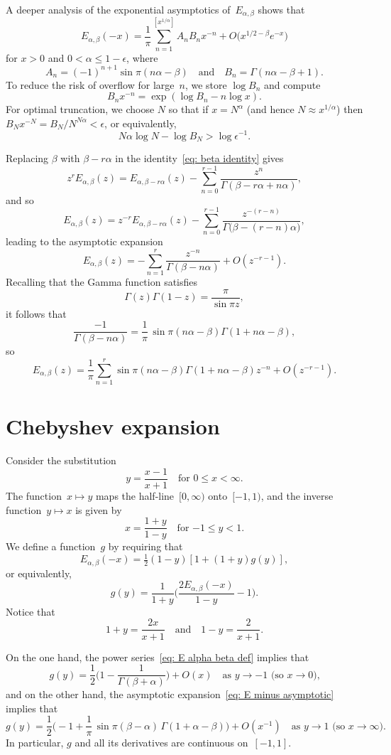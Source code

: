 \documentclass[12pt,a4paper]{article}
\begin{document}
A deeper analysis of the exponential asymptotics of~$E_{\alpha,\beta}$ shows
that~\cite[Theorem~2.2]{WongZhao2002}
\[
E_{\alpha,\beta}(-x)=\frac{1}{\pi}\sum_{n=1}^{[x^{1/\alpha}]}
    A_nB_nx^{-n}+O\bigl(x^{1/2-\beta}e^{-x}\bigr)
\]
for $x>0$ and $0<\alpha\le 1-\epsilon$, where
\[
A_n=(-1)^{n+1}\sin\pi(n\alpha-\beta)
\quad\text{and}\quad
B_n=\Gamma(n\alpha-\beta+1).
\]
To reduce the risk of overflow for large~$n$, we store $\log B_n$ and compute
\[
B_nx^{-n}=\exp(\log B_n-n\log x).
\]
For optimal truncation, we choose $N$ so that if $x=N^\alpha$ (and hence
$N\approx x^{1/\alpha}$) then $B_Nx^{-N}=B_N/N^{N\alpha}<\epsilon$, or 
equivalently,
\[
N\alpha\log N-\log B_N>\log\epsilon^{-1}.
\]

Replacing $\beta$ with $\beta-r\alpha$ in the identity~\eqref{eq: beta identity}
gives
\[
z^rE_{\alpha,\beta}(z)=E_{\alpha,\beta-r\alpha}(z)-\sum_{n=0}^{r-1}
\frac{z^n}{\Gamma(\beta-r\alpha+n\alpha)},
\]
and so
\[
E_{\alpha,\beta}(z)=z^{-r}E_{\alpha,\beta-r\alpha}(z)-\sum_{n=0}^{r-1}
\frac{z^{-(r-n)}}{\Gamma\bigl(\beta-(r-n)\alpha\bigr)},
\]
leading to the asymptotic expansion
\[
E_{\alpha,\beta}(z)=-\sum_{n=1}^r\frac{z^{-n}}{\Gamma(\beta-n\alpha)}
    +O(z^{-r-1}).
\]
Recalling that the Gamma function satisfies
\[
\Gamma(z)\Gamma(1-z)=\frac{\pi}{\sin\pi z},
\]
it follows that
\[
\frac{-1}{\Gamma(\beta-n\alpha)}=\frac{1}{\pi}\,\sin\pi(n\alpha-\beta)
    \Gamma(1+n\alpha-\beta),
\]
so
\[
E_{\alpha,\beta}(z)=\frac{1}{\pi}\sum_{n=1}^r\sin\pi(n\alpha-\beta)
    \Gamma(1+n\alpha-\beta)z^{-n}+O(z^{-r-1}).
\]






\section{Chebyshev expansion}
Consider the substitution
\[
y=\frac{x-1}{x+1}\quad\text{for $0\le x<\infty$.}
\]
The function~$x\mapsto y$ maps the half-line~$[0,\infty)$ onto~$[-1,1)$, and 
the inverse function~$y\mapsto x$ is given by
\[
x=\frac{1+y}{1-y}\quad\text{for $-1\le y<1$.}
\]
We define a function~$g$ by requiring that
\[
E_{\alpha,\beta}(-x)=\tfrac12(1-y)[1+(1+y)g(y)],
\]
or equivalently,
\[
g(y)=\frac{1}{1+y}\biggl(\frac{2E_{\alpha,\beta}(-x)}{1-y}-1\biggr).
\]
Notice that
\[
1+y=\frac{2x}{x+1}\quad\text{and}\quad 1-y=\frac{2}{x+1}.
\]

On the one hand, the power series~\eqref{eq: E alpha beta def} implies that
\[
g(y)=\frac{1}{2}\biggl(1-\frac{1}{\Gamma(\beta+\alpha)}\biggr)+O(x)
\quad\text{as $y\to-1$ (so $x\to0$),}
\]
and on the other hand, the asymptotic expansion~\eqref{eq: E minus asymptotic}
implies that
\[
g(y)=\frac{1}{2}\biggl(-1+\frac{1}{\pi}\,\sin\pi(\beta-\alpha)\,
    \Gamma(1+\alpha-\beta)\biggr)+O(x^{-1})\quad
\text{as $y\to1$ (so $x\to\infty$).}
\]
In particular, $g$ and all its derivatives are continuous on~$[-1,1]$.
\end{document}
